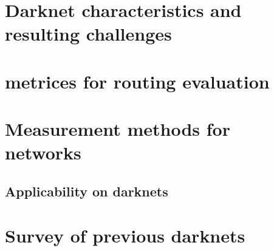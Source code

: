 \section{Darknet characteristics and resulting challenges}



\section{metrices for routing evaluation}



\section{Measurement methods for networks}


\subsection{Applicability on darknets}



\section{Survey of previous darknets}


